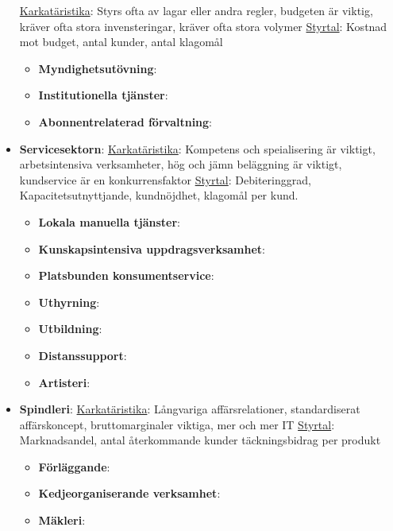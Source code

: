 \begin{multicols}{2}
\begin{itemize}
    \underline{Karkatäristika}:
    Styrs ofta av lagar eller andra regler, budgeten är viktig, kräver ofta stora invensteringar, kräver ofta stora volymer \newline
    \underline{Styrtal}:
    Kostnad mot budget, antal kunder, antal klagomål
    \begin{itemize}
        \item \textbf{Myndighetsutövning}:
        \item \textbf{Institutionella tjänster}:
        \item \textbf{Abonnentrelaterad förvaltning}:
    \end{itemize}
    \item \textbf{Servicesektorn}: \newline
    \underline{Karkatäristika}:
    Kompetens och speialisering är viktigt, arbetsintensiva verksamheter, hög och jämn beläggning är viktigt, kundservice är en konkurrensfaktor \newline
    \underline{Styrtal}:
    Debiteringgrad, Kapacitetsutnyttjande, kundnöjdhet, klagomål per kund.
    \begin{itemize}
        \item \textbf{Lokala manuella tjänster}:
        \item \textbf{Kunskapsintensiva uppdragsverksamhet}:
        \item \textbf{Platsbunden konsumentservice}:
        \item \textbf{Uthyrning}:
        \item \textbf{Utbildning}:
        \item \textbf{Distanssupport}:
        \item \textbf{Artisteri}:
    \end{itemize}
    \item \textbf{Spindleri}: \newline
    \underline{Karkatäristika}:
    Långvariga affärsrelationer, standardiserat affärskoncept, bruttomarginaler viktiga, mer och mer IT \newline
    \underline{Styrtal}:
    Marknadsandel, antal återkommande kunder täckningsbidrag per produkt
    \begin{itemize}
        \item \textbf{Förläggande}:
        \item \textbf{Kedjeorganiserande verksamhet}:
        \item \textbf{Mäkleri}:
    \end{itemize}
\end{itemize}


\end{multicols}
